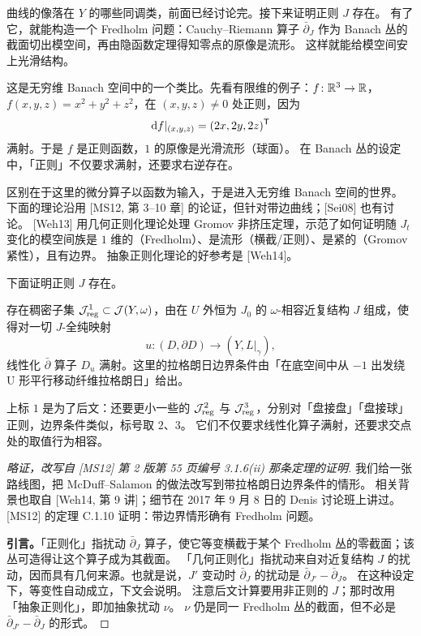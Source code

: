 曲线的像落在 $Y$ 的哪些同调类，前面已经讨论完。接下来证明正则 $J$ 存在。
有了它，就能构造一个 Fredholm 问题：Cauchy--Riemann 算子 $\bar\partial_J$ 作为 Banach 丛的截面切出模空间，再由隐函数定理得知零点的原像是流形。
这样就能给模空间安上光滑结构。


\begin{example}\label{c7:ex-banach-analogy}
这是无穷维 Banach 空间中的一个类比。先看有限维的例子：$f\colon\mathbb{R}^3\to\mathbb{R}$，$f(x,y,z)=x^2+y^2+z^2$，在 $(x,y,z)\neq0$ 处正则，因为
\[
\mathrm{d} f|_{(x,y,z)}=(2x,2y,2z)^{\mathsf T}
\]
满射。于是 $f$ 是正则函数，$1$ 的原像是光滑流形（球面）。
在 Banach 丛的设定中，「正则」不仅要求满射，还要求右逆存在。
\end{example}

区别在于这里的微分算子以函数为输入，于是进入无穷维 Banach 空间的世界。
下面的理论沿用 [MS12, 第 3--10 章] 的论证，但针对带边曲线；[Sei08] 也有讨论。
[Weh13] 用几何正则化理论处理 Gromov 非挤压定理，示范了如何证明随 $J_t$ 变化的模空间族是 $1$ 维的（Fredholm）、是流形（横截/正则）、是紧的（Gromov 紧性），且有边界。
抽象正则化理论的好参考是 [Weh14]。

下面证明正则 $J$ 存在。

\begin{lemma}[几何正则化]\label{c7:lem-geometric-reg}
存在稠密子集 $\mathcal{J}^1_{\mathrm{reg}}\subset\mathcal{J}(Y,\omega)$，由在 $U$ 外恒为 $J_0$ 的 $\omega$-相容近复结构 $J$ 组成，使得对一切 $J$-全纯映射
\[
u\colon(D,\partial D)\to(Y,L|_\gamma),
\]
线性化 $\bar\partial$ 算子 $D_u$ 满射。这里的拉格朗日边界条件由「在底空间中从 $-1$ 出发绕 U 形平行移动纤维拉格朗日」给出。
\end{lemma}

\begin{remark}\label{c7:rem-superscr}
上标 $1$ 是为了后文：还要更小一些的 $\mathcal{J}^2_{\mathrm{reg}}$ 与 $\mathcal{J}^3_{\mathrm{reg}}$，分别对「盘接盘」「盘接球」正则，边界条件类似，标号取 $2$、$3$。
它们不仅要求线性化算子满射，还要求交点处的取值行为相容。
\end{remark}

\begin{proof}[{略证，改写自 [MS12] 第 2 版第 55 页编号 3.1.6(ii) 那条定理的证明}]
我们给一张路线图，把 McDuff--Salamon 的做法改写到带拉格朗日边界条件的情形。
相关背景也取自 [Weh14, 第 9 讲]；细节在 2017 年 9 月 8 日的 Denis 讨论班上讲过。
[MS12] 的定理 C.1.10 证明：带边界情形确有 Fredholm 问题。

\textbf{引言。}「正则化」指扰动 $\bar\partial_J$ 算子，使它等变横截于某个 Fredholm 丛的零截面；该丛可造得让这个算子成为其截面。
「几何正则化」指扰动来自对近复结构 $J$ 的扰动，因而具有几何来源。也就是说，$J'$ 变动时 $\bar\partial_J$ 的扰动是 $\bar\partial_{J'}-\bar\partial_J$。
在这种设定下，等变性自动成立，下文会说明。
注意后文计算要用非正则的 $J$；那时改用「抽象正则化」，即加抽象扰动 $\nu$。
$\nu$ 仍是同一 Fredholm 丛的截面，但不必是 $\bar\partial_{J'}-\bar\partial_J$ 的形式。
\end{proof}


